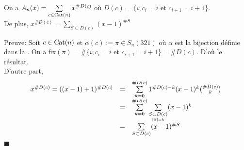 \begin{proposition}
	On a $A_{n}(x)=\sum\limits_{c\in \begin{rm}Cat\end{rm}(n)}x^{\#D(c)}$ où $D(c) = \{i; c_{i}=i \text{ et } c_{i+1}=i+1\}$.\vspace{5pt}\\
	De plus, $x^{\# D(c)} = \sum\limits_{S\subset D(c)}(x-1)^{\#S}$
\end{proposition}
Preuve: Soit $c\in \begin{rm}Cat\end{rm}(n)$ et $\alpha(c):=\pi \in S_{n}(321)$ où $\alpha$ est la bijection définie dans la . On a fix$(\pi) = \# \{i; c_{i}=i \text{ et } c_{i+1}=i+1\}=\#D(c)$. D'où le résultat.\vspace{5pt}\\
D'autre part, 
\[
	\begin{array}{l l l}
		x^{\#D(c)}= ((x-1)+1)^{\#D(c)}&=& \sum\limits_{k=0}^{\#D(c)} 1^{\#D(c)-k}(x-1)^{k}\binom{ \#D(c)}{ k}\\
		&=& \sum\limits_{k=0}^{\#D(c)}\sum\limits_{\underset{|S|=k}{S\subset D(c)}}(x-1)^{k}\\
		&=& \sum\limits_{S\subset D(c)}(x-1)^{\#S}
	\end{array}
\]
$\blacksquare$\vspace{10pt}\\

